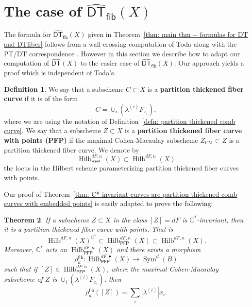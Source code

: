 \documentclass[12pt]{amsart}
\newtheorem{theorem}{Theorem}%
\theoremstyle{definition}
\newtheorem{definition}[theorem]{Definition}
\newcommand{\CC} {\mathbb{C}}          %
\newcommand{\Sym}{\operatorname{Sym}}
\newcommand{\Hilb}{\operatorname{Hilb}}
\newcommand{\DT}{\mathsf{DT}}
\newcommand{\CM}{\operatorname{CM}}
\newcommand{\DThat}{\widehat{\DT}}
\newcommand{\fiber}{\mathsf{fib}}
\newcommand{\PFP}{\mathsf{PFP}}
\newcommand{\presectionspace}{\vspace{0.2cm}} %
\begin{document}
\presectionspace
\section{The case of $\DThat_{\fiber}(X)$}\label{sec: DThatfiber computation}

The formula for $\DThat_{\fiber}(X)$ given in Theorem~\ref{thm: main
thm -- formulas for DT and DTfiber} follows from a wall-crossing
computation of Toda \cite[Thm~6.9]{Toda-2012-Kyoto} along with the
PT/DT correspondence \cite{Bridgeland-PTDT}. However in this section
we describe how to adapt our computation of $\DThat (X)$ to the easier
case of $\DThat_{\fiber}(X)$. Our approach yields a proof which is
independent of Toda's.


\begin{definition}\label{defn: partition thickened fiber curve}
We say that a subscheme $C\subset X$ is a \textbf{partition thickened
fiber curve} if it is of the form
\[
C= \cup_{i}\left( \lambda^{(i)}F_{x_{i}} \right),
\]
where we are using the notation of Definition~\ref{defn: partition
thickened comb curve}. We say that a subscheme $Z\subset X$ is a
\textbf{partition thickened fiber curve with points (PFP)} if the
maximal Cohen-Macaulay subscheme $Z_{\CM}\subset Z$ is a partition
thickened fiber curve. We denote by
\[
\Hilb^{dF,n}_{\PFP}(X)\subset \Hilb^{dF,n}(X)
\]
the locus in the Hilbert scheme parameterizing partition thickened
fiber curves with points. 
\end{definition}

Our proof of Theorem~\ref{thm: C* invariant curves are partition thickened
comb curves with embedded points} is easily adapted to prove the
following:
\begin{theorem}\label{thm: C* fixed fiber curves are PFP}
If a subscheme $Z\subset X$ in the class $[Z]=dF$ is
$\CC^{*}$-invariant, then it is a partition thickened fiber curve with
points. That is
\[
\Hilb^{dF,n}(X)^{\CC^{*}} \subset \Hilb^{dF,n}_{\PFP}(X) \subset \Hilb^{dF,n}(X).
\]
Moreover, $\CC^{*}$ acts on $\Hilb^{dF,n}_{\PFP}(X)$ and there exists
a morphism
\[
\rho^{\fiber}_{d}:\Hilb^{dF,\bullet}_{\PFP}(X) \to \Sym^{d}(B) 
\]
such that if $[Z]\in \Hilb^{dF,n}_{\PFP}(X)$, where the maximal
Cohen-Macaulay subscheme of $Z$ is
$\cup_{i}\left(\lambda^{(i)}F_{x_{i}} \right)$, then
\[
\rho_{d}^{\fiber}([Z]) = \sum_{i} |\lambda^{(i)}|x_{i}.
\]
\end{theorem}
\end{document}
